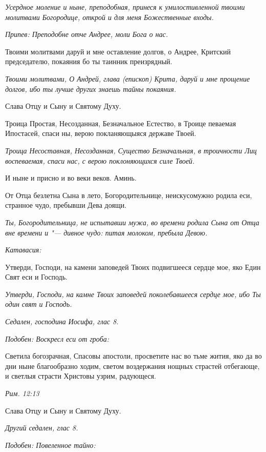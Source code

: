 \itshape Усердное моление и ныне, преподобная, принеся к умилостивленной твоими молитвами Богородице, открой и для меня Божественные входы.\normalfont{}


\itshape Припев:\normalfont{} Преподобне отче Андрее, моли Бога о нас.


Твоими молитвами даруй и мне оставление долгов, о Андрее, Критский председателю, покаяния бо ты таинник преизрядный.


\itshape Твоими молитвами, О Андрей, глава (епископ) Крита, даруй и мне прощение долгов, ибо ты лучше других знаешь тайны покаяния.\normalfont{}


Слава Отцу и Сыну и Святому Духу.


Троица Простая, Несозданная, Безначальное Естество, в Троице певаемая Ипостасей, спаси ны, верою покланяющыяся державе Твоей.


\itshape Троица Несоставная, Несозданная, Существо Безначальная, в троичности Лиц воспеваемая, спаси нас, с верою поклоняющихся силе Твоей.\normalfont{}


И ныне и присно и во веки веков. Аминь.


От Отца безлетна Сына в лето, Богородительнице, неискусомужно родила еси, странное чудо, пребывши Дева доящи.


\itshape Ты, Богородительница, не испытавши мужа, во времени родила Сына от Отца вне времени и "--- дивное чудо: питая молоком, пребыла Девою.\normalfont{}


\itshape Катавасия:\normalfont{}


Утверди, Господи, на камени заповедей Твоих подвигшееся сердце мое, яко Един Свят еси и Господь.


\itshape Утверди, Господи, на камне Твоих заповедей поколебавшееся сердце мое, ибо Ты один свят и Господь.\normalfont{}


\itshape Седален, господина Иосифа, глас 8.\normalfont{}


\itshape Подобен:\normalfont{} Воскресл еси от гроба:


Светила богозрачная, Спасовы апостоли, просветите нас во тьме жития, яко да во дни ныне благообразно ходим, светом воздержания нощных страстей отбегающе, и светлыя страсти Христовы узрим, радующеся.


\itshape Рим. 12:13\normalfont{}


Слава Отцу и Сыну и Святому Духу.


\itshape Другий седален, глас 8.\normalfont{}


\itshape Подобен:\normalfont{} Повеленное тайно:


